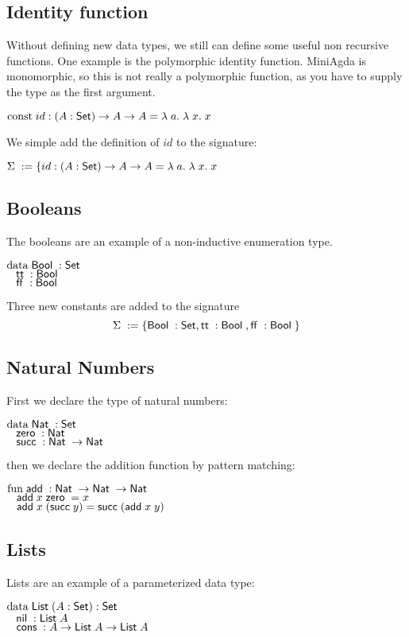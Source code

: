 \subsection{Identity function}
Without defining new data types, we still can define some useful non recursive functions.
One example is the polymorphic identity function. 
MiniAgda is monomorphic, so this is not really a polymorphic function, as you have to supply the
type as the first argument.
\begin{bsp}
$\mathrm{const}\; id : ( A : \mathsf{Set} ) \rightarrow{A \rightarrow A} = \lambda\; a .\;\lambda\; x .\;x$   
\end{bsp}
We simple add the definition of $id$ to the signature:
\begin{bsp}
$\Sigma\; := \{ id : ( A : \mathsf{Set} ) \rightarrow{A \rightarrow A} = \lambda\; a .\;\lambda\; x .\;x$
\end{bsp}
\subsection{Booleans}
The booleans are an example of a non-inductive enumeration type.
\begin{bsp}
$\mathrm{data}\; \mathsf{Bool}\; : \mathsf{Set}$  \\
$\hspace*{3mm} \mathsf{tt}\; : \mathsf{Bool}\; $\\
$\hspace*{3mm} \mathsf{ff}\; : \mathsf{Bool}\; $
\end{bsp}
Three new constants are added to the signature
\[ \Sigma\; := \{ \mathsf{Bool}\; : \mathsf{Set} , \mathsf{tt}\; : \mathsf{Bool}\; , \mathsf{ff}\; : \mathsf{Bool}\; \} \]
\subsection{Natural Numbers}
First we declare the type of natural numbers:
\begin{bsp}
$\mathrm{data}\; \mathsf{Nat}\; : \mathsf{Set}$ \\
$\hspace*{3mm} \mathsf{zero}\; : \mathsf{Nat}\; $\\
$\hspace*{3mm} \mathsf{succ}\; : \mathsf{Nat}\; \rightarrow \mathsf{Nat}\;$
\end{bsp}
then we declare the addition function by pattern matching:
\begin{bsp}
$\mathrm{fun}\; \mathsf{add}\; : \mathsf{Nat}\; \rightarrow \mathsf{Nat}\; \rightarrow \mathsf{Nat}\;$\\
$\hspace*{3mm} \mathsf{add}\; x \; \mathsf{zero}\; = x $\\
$\hspace*{3mm} \mathsf{add}\; x \; (\mathsf{succ}\; y) = \mathsf{succ}\; (\mathsf{add}\; x \; y)  $
\end{bsp}
\subsection{Lists}
Lists are an example of a parameterized data type:
\begin{bsp}
$\mathrm{data}\; \mathsf{List}\; ( A : \mathsf{Set} ) : \mathsf{Set} $ \\
$ \hspace*{3mm} \mathsf{nil}\; : \mathsf{List}\; A  $\\
$ \hspace*{3mm} \mathsf{cons}\; : A \rightarrow \mathsf{List}\; A \rightarrow \mathsf{List}\; A $
\end{bsp}
